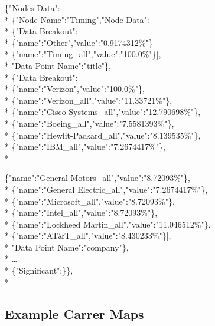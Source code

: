 \noindent \{"Nodes Data":\\*
	\indent \{"Node Name":"Timing","Node Data":\\*
		\indent \{"Data Breakout":\\*
		\indent \indent	\{"name":"Other","value":"0.9174312\%"\}\\*
		\indent	\indent \{"name":"Timing_all","value":"100.0\%"\}],\\*
		\indent	"Data Point Name":"title"\},\\*
		\indent\{"Data Breakout":\\*
		\indent	\indent	\{"name":"Verizon","value":"100.0\%"\},\\*
		\indent	\indent	\{"name":"Verizon_all","value":"11.33721\%"\},\\*
		\indent	\indent	\{"name":"Cisco Systems_all","value":"12.790698\%"\},\\*
		\indent	\indent	\{"name":"Boeing_all","value":"7.5581393\%"\},\\*
		\indent	\indent	\{"name":"Hewlit-Packard_all","value":"8.139535\%"\},\\*
		\indent	\indent	\{"name":"IBM_all","value":"7.2674417\%"\},\\*
		
		\indent	\indent	\{"name":"General Motors_all","value":"8.72093\%"\},\\*
		\indent	\indent	\{"name":"General Electric_all","value":"7.2674417\%"\},\\*
		\indent	\indent	\{"name":"Microsoft_all","value":"8.72093\%"\},\\*
		\indent	\indent	\{"name":"Intel_all","value":"8.72093\%"\},\\*
		\indent	\indent	\{"name":"Lockheed Martin_all","value":"11.046512\%"\},\\*
		\indent	\indent	\{"name":"AT&T_all","value":"8.430233\%"\}],\\*
		\indent"Data Point Name":"company"\},\\*
		\indent\ldots\\*
		\indent \{"Significant":\}\},\\*

\subsection{Example Carrer Maps}

\usetikzlibrary{shapes,arrows,chains}

